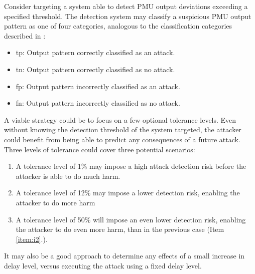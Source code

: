 Consider targeting a system able to detect PMU output deviations exceeding a specified threshold. The detection system may classify a suspicious PMU output pattern as one of four categories, analogous to the classification categories described in \cite[p. 5]{kunang2021attack}: 
\begin{itemize}
    \item \acrfull{tp}: Output pattern correctly classified as an attack.
    \item \acrfull{tn}:  Output pattern correctly classified as no attack.
    \item \acrfull{fp}: Output pattern incorrectly classified as an attack.
    \item \acrfull{fn}: Output pattern incorrectly classified as no attack.
\end{itemize}

 
A viable strategy could be to focus on a few optional tolerance levels. Even without knowing the detection threshold of the system targeted, the attacker could benefit from being able to predict any consequences of a future attack. Three levels of tolerance could cover three potential scenarios:
\begin{enumerate}
    \item A tolerance level of 1\% may impose a high attack detection risk before the attacker is able to do much harm.
    \item A tolerance level of 12\% may impose a lower detection risk, enabling the attacker to do more harm
\label{item:i2}    \item A tolerance level of 50\% will impose an even lower detection risk, enabling the attacker to do even more harm, than in the previous case (Item \ref{item:i2}.).
   
\end{enumerate}

It may also be a good approach to determine any effects of a small increase in delay level, versus executing the attack using a fixed delay level.

